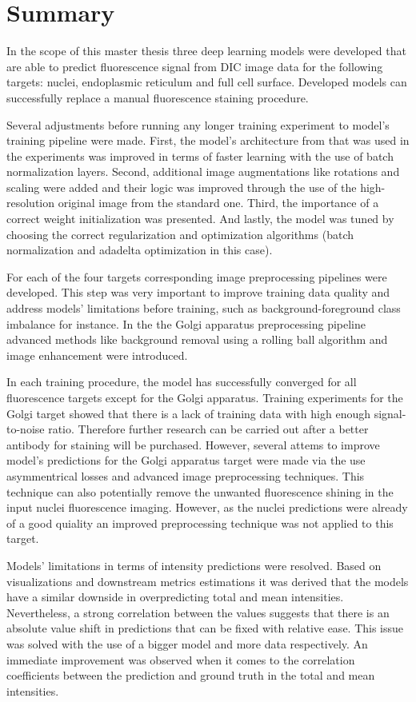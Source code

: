 \section{Summary}
In the scope of this master thesis three deep learning models were developed that are able to predict fluorescence signal from DIC image data for the following targets: nuclei, endoplasmic reticulum and full cell surface. Developed models can successfully replace a manual fluorescence staining procedure. 

Several adjustments before running any longer training experiment to model's training pipeline were made. First, the model's architecture from \cite{Lachance_2020} that was used in the experiments was improved in terms of faster learning with the use of batch normalization layers. Second, additional image augmentations like rotations and scaling were added and their logic was improved through the use of the high-resolution original image from the standard one. Third, the importance of a correct weight initialization was presented. And lastly, the model was tuned by choosing the correct regularization and optimization algorithms (batch normalization and adadelta optimization in this case). 

For each of the four targets corresponding image preprocessing pipelines were developed. This step was very important to improve training data quality and address models' limitations before training, such as background-foreground class imbalance for instance. In the the Golgi apparatus preprocessing pipeline advanced methods like background removal using a rolling ball algorithm and image enhancement were introduced.

In each training procedure, the model has successfully converged for all fluorescence targets except for the Golgi apparatus. Training experiments for the Golgi target showed that there is a lack of training data with high enough signal-to-noise ratio. Therefore further research can be carried out after a better antibody for staining will be purchased. However, several attems to improve model's predictions for the Golgi apparatus target were made via the use asymmentrical losses and advanced image preprocessing techniques. This technique can also potentially remove the unwanted fluorescence shining in the input nuclei fluorescence imaging. However, as the nuclei predictions were already of a good quiality an improved preprocessing technique was not applied to this target. 

Models' limitations in terms of intensity predictions were resolved. Based on visualizations and downstream metrics estimations it was derived that the models have a similar downside in overpredicting total and mean intensities. Nevertheless, a strong correlation between the values suggests that there is an absolute value shift in predictions that can be fixed with relative ease. This issue was solved with the use of a bigger model and more data respectively. An immediate improvement was observed when it comes to the correlation coefficients between the prediction and ground truth in the total and mean intensities. 

